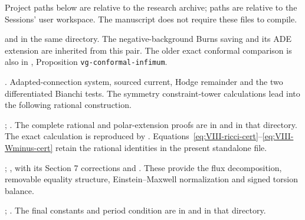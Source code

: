 \documentclass[11pt]{article}
\theoremstyle{definition}
\theoremstyle{remark}
\begin{document}
Project paths below are relative to the research archive;
 paths are relative to the Sessions' user workspace.
The manuscript does not require these files to compile.
\begingroup\small\raggedright
\begin{description}[style=nextline]
\item[Baseline]
and  in the same directory.
The negative-background Burns saving and its ADE extension are inherited
from this pair. The older exact conformal comparison is also in
,
Proposition \texttt{vg-conformal-infimum}.
\item[A01.56]
.
Adapted-connection system, sourced current, Hodge remainder and the
two differentiated Bianchi tests. The symmetry constraint-tower calculations
lead into the following rational construction.
\item[A01.57--58]
;
.
The complete rational and polar-extension proofs are in
and  in that directory.
The exact calculation is reproduced by
.
Equations~\eqref{eq:VIII-ricci-cert}--\eqref{eq:VIII-Wminus-cert}
retain the rational identities in the present standalone file.
\item[A02.65--66]
;
,
with its Section 7 corrections and
.
These provide the flux decomposition, removable equality structure,
Einstein--Maxwell normalization and signed torsion balance.
\item[A02.67--68]
;
.
The final constants and period condition are in
and  in that directory.

\end{description}
\end{document}
